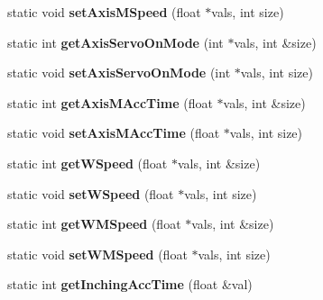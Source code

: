 \begin{DoxyCompactItemize}
\item 
\hypertarget{classRobotConf_a1816f64a38a895df800e0767cc109680}{static void {\bfseries set\-Axis\-M\-Speed} (float $\ast$vals, int size)}\label{classRobotConf_a1816f64a38a895df800e0767cc109680}

\item 
\hypertarget{classRobotConf_af980b35e62ca3955d534d7dc1e182c5c}{static int {\bfseries get\-Axis\-Servo\-On\-Mode} (int $\ast$vals, int \&size)}\label{classRobotConf_af980b35e62ca3955d534d7dc1e182c5c}

\item 
\hypertarget{classRobotConf_a76091c2fab041dfdd997fa99bc9c6203}{static void {\bfseries set\-Axis\-Servo\-On\-Mode} (int $\ast$vals, int size)}\label{classRobotConf_a76091c2fab041dfdd997fa99bc9c6203}

\item 
\hypertarget{classRobotConf_ab579260b25318a65f91559f338771c6c}{static int {\bfseries get\-Axis\-M\-Acc\-Time} (float $\ast$vals, int \&size)}\label{classRobotConf_ab579260b25318a65f91559f338771c6c}

\item 
\hypertarget{classRobotConf_adc8659261fb0c4827fb95e46a3573cec}{static void {\bfseries set\-Axis\-M\-Acc\-Time} (float $\ast$vals, int size)}\label{classRobotConf_adc8659261fb0c4827fb95e46a3573cec}

\item 
\hypertarget{classRobotConf_aea626a5510cfaf9800de8898b4d20e0f}{static int {\bfseries get\-W\-Speed} (float $\ast$vals, int \&size)}\label{classRobotConf_aea626a5510cfaf9800de8898b4d20e0f}

\item 
\hypertarget{classRobotConf_afa87d61afe7f23cb96d13bc602df6a07}{static void {\bfseries set\-W\-Speed} (float $\ast$vals, int size)}\label{classRobotConf_afa87d61afe7f23cb96d13bc602df6a07}

\item 
\hypertarget{classRobotConf_a0a3b442bddb6b5aabd51b6c1e9dd2c39}{static int {\bfseries get\-W\-M\-Speed} (float $\ast$vals, int \&size)}\label{classRobotConf_a0a3b442bddb6b5aabd51b6c1e9dd2c39}

\item 
\hypertarget{classRobotConf_a86a4f960d40e51b0a956aab395c1990f}{static void {\bfseries set\-W\-M\-Speed} (float $\ast$vals, int size)}\label{classRobotConf_a86a4f960d40e51b0a956aab395c1990f}

\item 
\hypertarget{classRobotConf_af8ceb2378c09f50b1f82caec2d722c4a}{static int {\bfseries get\-Inching\-Acc\-Time} (float \&val)}\label{classRobotConf_af8ceb2378c09f50b1f82caec2d722c4a}


\end{DoxyCompactItemize}
